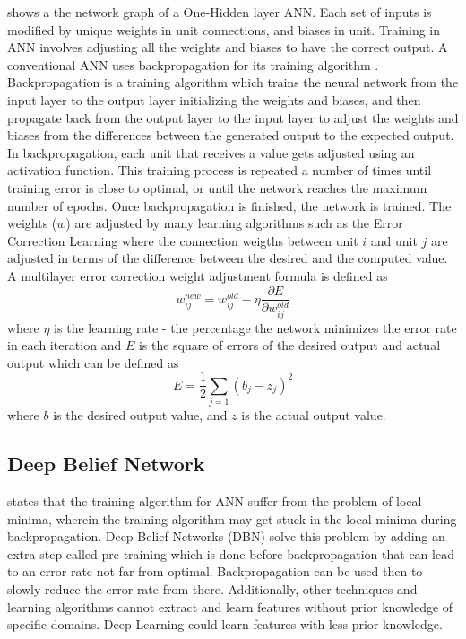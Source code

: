  shows a the network graph of a One-Hidden layer ANN. Each set of inputs is modified by unique weights in unit connections, and biases in unit. Training in ANN involves adjusting all the weights and biases to have the correct output. A conventional ANN uses backpropagation for its training algorithm . Backpropagation is a training algorithm which trains the neural network from the input layer to the output layer initializing the weights and biases, and then propagate back from the output layer to the input layer to adjust the weights and biases from the differences between the generated output to the expected output. In backpropagation, each unit that receives a value gets adjusted using an activation function. This training process is repeated a number of times until training error is close to optimal, or until the network reaches the maximum number of epochs. Once backpropagation is finished, the network is trained. The weights ($w$) are adjusted by many learning algorithms such as the Error Correction Learning where the connection weigths between unit $i$ and unit $j$ are adjusted in terms of the difference between the desired and the computed value. A multilayer error correction weight adjustment formula is defined as 
\begin{equation}
w_{ij}^{new} = w_{ij}^{old} - \eta \frac{\partial  E}{\partial  w_{ij}^{old}}
\end{equation}
\noindent where $\eta$ is the learning rate - the percentage the network minimizes the error rate in each iteration and $E$ is the square of errors of the desired output and actual output which can be defined as 
\begin{equation}
E = \frac{1}{2} \sum_{j=1} \left(b_{j} - z_j\right)^2
\end{equation}
\noindent where $b$ is the desired output value, and $z$ is the actual output value.

\subsection{Deep Belief Network}
 states that the training algorithm for ANN suffer from the problem of local minima, wherein the training algorithm may get stuck in the local minima during backpropagation. Deep Belief Networks (DBN) solve this problem by adding an extra step called pre-training which is done before backpropagation that can lead to an error rate not far from optimal. Backpropagation can be used then to slowly reduce the error rate from there. Additionally, other techniques and learning algorithms cannot extract and learn features without prior knowledge of specific domains. Deep Learning could learn features with less prior knowledge. 

